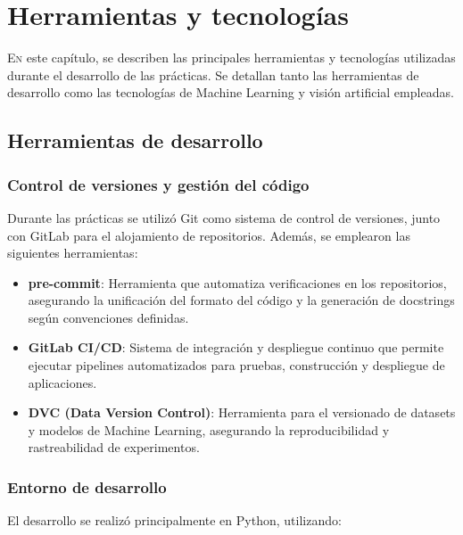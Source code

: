 \chapter{Herramientas y tecnologías}
\label{chap:tecnoloxias}

\lettrine{E}{n} este capítulo, se describen las principales herramientas y tecnologías utilizadas durante el desarrollo de las prácticas. Se detallan tanto las herramientas de desarrollo como las tecnologías de Machine Learning y visión artificial empleadas.


\section{Herramientas de desarrollo}\label{sec:tecnologias}

\subsection{Control de versiones y gestión del código}\label{subsec:git}
Durante las prácticas se utilizó Git como sistema de control de versiones, junto con GitLab para el alojamiento de repositorios. Además, se emplearon las siguientes herramientas:

\begin{itemize}
    \item \textbf{pre-commit}: Herramienta\cite{pre_commit} que automatiza verificaciones en los repositorios, asegurando la unificación del formato del código y la generación de docstrings según convenciones definidas.
    \item \textbf{GitLab CI/CD}: Sistema\cite{gitlab_ci} de integración y despliegue continuo que permite ejecutar pipelines automatizados para pruebas, construcción y despliegue de aplicaciones.
    \item \textbf{DVC (Data Version Control)}: Herramienta\cite{dvc} para el versionado de datasets y modelos de Machine Learning, asegurando la reproducibilidad y rastreabilidad de experimentos.
\end{itemize}

\subsection{Entorno de desarrollo}\label{subsec:entorno}
El desarrollo se realizó principalmente en Python, utilizando:

